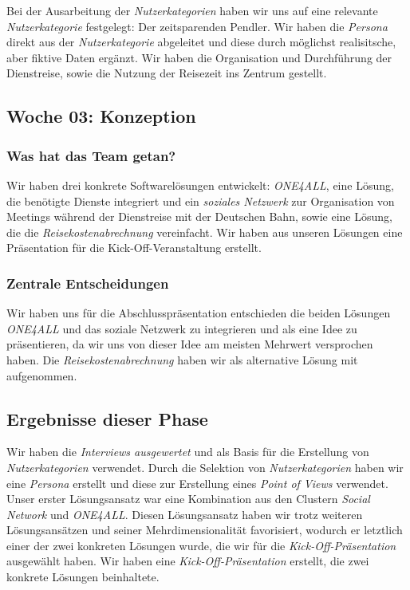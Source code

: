 \documentclass{article}
\begin{document}
Bei der Ausarbeitung der \textit{Nutzerkategorien} haben wir uns auf eine relevante \textit{Nutzerkategorie} festgelegt: Der zeitsparenden Pendler. Wir haben die \textit{Persona} direkt aus der \textit{Nutzerkategorie} abgeleitet und diese durch m\"oglichst realisitsche, aber fiktive Daten erg\"anzt. Wir haben die Organisation und Durchf\"uhrung der Dienstreise, sowie die Nutzung der Reisezeit ins Zentrum gestellt.

\subsection{Woche 03: Konzeption}

\subsubsection{Was hat das Team getan?}

Wir haben drei konkrete Softwarel\"osungen entwickelt: \textit{ONE4ALL}, eine L\"osung, die ben\"otigte Dienste integriert und ein \textit{soziales Netzwerk} zur Organisation von Meetings w\"ahrend der Dienstreise mit der Deutschen Bahn, sowie eine L\"osung, die die \textit{Reisekostenabrechnung} vereinfacht. Wir haben aus unseren L\"osungen eine Pr\"asentation f\"ur die Kick-Off-Veranstaltung erstellt.

\subsubsection{Zentrale Entscheidungen}

Wir haben uns f\"ur die Abschlusspr\"asentation entschieden die beiden L\"osungen \textit{ONE4ALL} und das soziale Netzwerk zu integrieren und als eine Idee zu pr\"asentieren, da wir uns von dieser Idee am meisten Mehrwert versprochen haben. Die \textit{Reisekostenabrechnung} haben wir als alternative L\"osung mit aufgenommen. 

\subsection{Ergebnisse dieser Phase}

Wir haben die \textit{Interviews ausgewertet} und als Basis f\"ur die Erstellung von \textit{Nutzerkategorien} verwendet. Durch die Selektion von \textit{Nutzerkategorien} haben wir eine \textit{Persona} erstellt und diese zur Erstellung eines \textit{Point of Views} verwendet. Unser erster L\"osungsansatz war eine Kombination aus den Clustern \textit{Social Network} und \textit{ONE4ALL}. Diesen L\"osungsansatz haben wir trotz weiteren L\"osungsans\"atzen und seiner Mehrdimensionalit\"at favorisiert, wodurch er letztlich einer der zwei konkreten L\"osungen wurde, die wir f\"ur die \textit{Kick-Off-Pr\"asentation} ausgew\"ahlt haben. Wir haben eine \textit{Kick-Off-Pr\"asentation} erstellt, die zwei konkrete L\"osungen beinhaltete.
\end{document}
